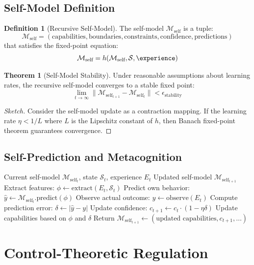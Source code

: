 \documentclass[12pt]{article}
\theoremstyle{definition}
\newtheorem{definition}{Definition}[section]
\newtheorem{theorem}{Theorem}[section]
\newcommand{\state}{\mathcal{S}}
\newcommand{\self}{\mathcal{M}_{\text{self}}}
\begin{document}
\subsection{Self-Model Definition}

\begin{definition}[Recursive Self-Model]
The self-model $\self$ is a tuple:
\[
\self = (\text{capabilities}, \text{boundaries}, \text{constraints}, \text{confidence}, \text{predictions})
\]
that satisfies the fixed-point equation:
\[
\self = h(\self, \state, \experience)
\]
\end{definition}

\begin{theorem}[Self-Model Stability]
Under reasonable assumptions about learning rates, the recursive self-model converges to a stable fixed point:
\[
\lim_{t \to \infty} \|\self_{t+1} - \self_t\| < \epsilon_{\text{stability}}
\]
\end{theorem}

\begin{proof}[Sketch]
Consider the self-model update as a contraction mapping. If the learning rate $\eta < 1/L$ where $L$ is the Lipschitz constant of $h$, then Banach fixed-point theorem guarantees convergence.
\end{proof}

\subsection{Self-Prediction and Metacognition}

\begin{algorithm}
\caption{Recursive Self-Model Update}
\begin{algorithmic}[1]
\REQUIRE Current self-model $\self_t$, state $\state_t$, experience $E_t$
\ENSURE Updated self-model $\self_{t+1}$
\STATE Extract features: $\phi \gets \text{extract}(E_t, \state_t)$
\STATE Predict own behavior: $\hat{y} \gets \self_t.\text{predict}(\phi)$
\STATE Observe actual outcome: $y \gets \text{observe}(E_t)$
\STATE Compute prediction error: $\delta \gets |\hat{y} - y|$
\STATE Update confidence: $c_{t+1} \gets c_t \cdot (1 - \eta \delta)$
\STATE Update capabilities based on $\phi$ and $\delta$
\STATE Return $\self_{t+1} \gets (\text{updated capabilities}, c_{t+1}, \dots)$
\end{algorithmic}
\end{algorithm}

\section{Control-Theoretic Regulation}
\end{document}
